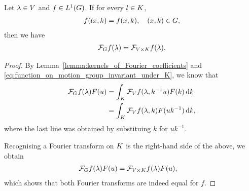 \begin{corollary}
    Let $\lambda \in \VectorSpace$ and $f \in \Lebesgue 1 \Group$.
    If for every $l \in \CompactGroup$,
    \begin{align}
        f(l x, k) = f(x, k), \quad (x, k) \in \Group,
        \label{eq:function_on_motion_group_invariant_under_K}
    \end{align}
    then we have
    \begin{align*}
        \Fourier f(\lambda) = \Fourier [\GroupDirect] f(\lambda).
    \end{align*}
\end{corollary}
\begin{proof}
    By Lemma~\ref{lemma:kernels_of_Fourier_coefficients} and \eqref{eq:function_on_motion_group_invariant_under_K},
    we know that
    \begin{align*}
        \Fourier f(\lambda) F(u)
        &=
        \int_\CompactGroup \Fourier [\VectorSpace] f(\lambda, k^{-1} u) F(k) \dd k\\
        &=
        \int_\CompactGroup \Fourier [\VectorSpace] f(\lambda, k) F(u k^{-1}) \dd k,
    \end{align*}
    where the last line was obtained by substituing $k$ for $u k^{-1}$.

    Recognising a Fourier transform on $\CompactGroup$ is the right-hand side of the above,
    we obtain
    \begin{align*}
        \Fourier f(\lambda) F(u)
        &=
        \Fourier [\GroupDirect] f(\lambda) F(u),
    \end{align*}
    which shows that both Fourier transforms are indeed equal for $f$.
\end{proof}

